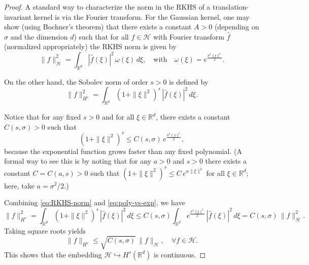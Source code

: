 \begin{proof}
A standard way to characterize the norm in the RKHS of a translation-invariant kernel is via the Fourier transform. For the Gaussian kernel, one may show (using Bochner's theorem) that there exists a constant \(A>0\) (depending on \(\sigma\) and the dimension \(d\)) such that for all \(f\in \mathcal{H}\) with Fourier transform \(\hat{f}\) (normalized appropriately) the RKHS norm is given by
\begin{equation} \label{eq:RKHS-norm}
\|f\|_{\mathcal{H}}^2 = \int_{\mathbb{R}^d} |\hat{f}(\xi)|^2\,\omega(\xi)\,d\xi, \quad \text{with} \quad \omega(\xi) = e^{\frac{\sigma^2 \|\xi\|^2}{2}}.
\end{equation}

On the other hand, the Sobolev norm of order \(s>0\) is defined by
\[
\|f\|_{H^s}^2 = \int_{\mathbb{R}^d} (1+\|\xi\|^2)^s\, |\hat{f}(\xi)|^2\,d\xi.
\]

Notice that for any fixed \(s>0\) and for all \(\xi\in\mathbb{R}^d\), there exists a constant \(C(s,\sigma)>0\) such that
\begin{equation} \label{eq:poly-vs-exp}
(1+\|\xi\|^2)^s \le C(s,\sigma)\, e^{\frac{\sigma^2 \|\xi\|^2}{2}},
\end{equation}
because the exponential function grows faster than any fixed polynomial. (A formal way to see this is by noting that for any \(a>0\) and \(s>0\) there exists a constant \(C=C(a,s)>0\) such that \((1+\|\xi\|^2)^s \le C\, e^{a\|\xi\|^2}\) for all \(\xi\in\mathbb{R}^d\); here, take \(a=\sigma^2/2\).)

Combining \eqref{eq:RKHS-norm} and \eqref{eq:poly-vs-exp}, we have
\[
\|f\|_{H^s}^2 = \int_{\mathbb{R}^d} (1+\|\xi\|^2)^s\, |\hat{f}(\xi)|^2\,d\xi 
\le C(s,\sigma) \int_{\mathbb{R}^d} e^{\frac{\sigma^2 \|\xi\|^2}{2}}\, |\hat{f}(\xi)|^2\,d\xi 
= C(s,\sigma) \, \|f\|_{\mathcal{H}}^2.
\]
Taking square roots yields
\[
\|f\|_{H^s} \le \sqrt{C(s,\sigma)}\,\|f\|_{\mathcal{H}}, \quad \forall f\in \mathcal{H}.
\]
This shows that the embedding \(\mathcal{H} \hookrightarrow H^s(\mathbb{R}^d)\) is continuous.

\end{proof}

\fi

